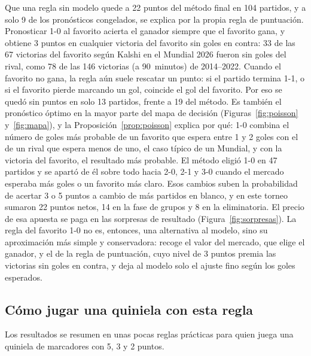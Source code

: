 \documentclass[12pt]{article}
\theoremstyle{plain}
\theoremstyle{remark}
\begin{document}
Que una regla sin modelo quede a 22 puntos del método final en 104
partidos, y a solo 9 de los pronósticos congelados, se explica por la
propia regla de puntuación.
Pronosticar 1-0 al favorito acierta el ganador siempre que el favorito
gana, y obtiene 3 puntos en cualquier victoria del favorito sin goles
en contra: 33 de las 67 victorias del favorito según Kalshi en el
Mundial 2026 fueron sin goles del rival, como 78 de las 146 victorias
(a 90~minutos) de 2014--2022.
Cuando el favorito no gana, la regla aún suele rescatar un punto: si
el partido termina 1-1, o si el favorito pierde marcando un gol,
coincide el gol del favorito.
Por eso se quedó sin puntos en solo 13 partidos, frente a 19 del
método.
Es también el pronóstico óptimo en la mayor parte del mapa de decisión
(Figuras~\ref{fig:poisson} y~\ref{fig:mapa}), y la
Proposición~\ref{prop:poisson} explica por qué: 1-0 combina el número
de goles más probable de un favorito que espera entre 1 y 2 goles con
el de un rival que espera menos de uno, el caso típico de un Mundial,
y con la victoria del favorito, el resultado más probable.
El método eligió 1-0 en 47 partidos y se
apartó de él sobre todo hacia 2-0, 2-1 y 3-0 cuando el mercado
esperaba más goles o un favorito más claro.
Esos cambios suben la probabilidad de acertar 3 o 5 puntos a cambio de
más partidos en blanco, y en este torneo sumaron 22 puntos netos, 14
en la fase de grupos y 8 en la eliminatoria.
El precio de esa apuesta se paga en las sorpresas de resultado
(Figura~\ref{fig:sorpresas}).
La regla del favorito 1-0 no es, entonces, una alternativa al modelo,
sino su aproximación más simple y conservadora: recoge el valor del mercado, que
elige el ganador, y el de la regla de puntuación, cuyo nivel de
3 puntos premia las victorias sin goles en contra, y deja al modelo
solo el ajuste fino según los goles esperados.

\subsection{Cómo jugar una quiniela con esta regla}

Los resultados se resumen en unas pocas reglas prácticas para quien
juega una quiniela de marcadores con 5, 3 y 2 puntos.
\end{document}
